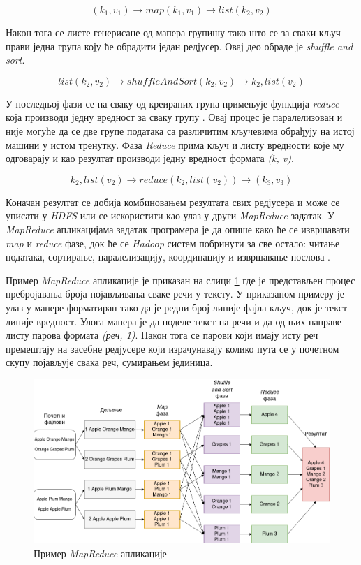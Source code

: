 \documentclass[12pt,oneside]{memoir}
\begin{document}
$$ (k_1, v_1) \rightarrow map(k_1, v_1) \rightarrow list(k_2, v_2) $$

Након тога се листе генерисане од мапера групишу тако што се за сваки кључ прави једна група коју ће обрадити један редјусер. Овај део обраде је \textit{shuffle and sort}. 

$$ list(k_2, v_2) \rightarrow shuffleAndSort(k_2, v_2) \rightarrow k_2, list(v_2) $$

У последњој фази се на сваку од креираних група примењује функција \textit{reduce} која производи једну вредност за сваку групу \cite{hadoop_learning}. Овај процес је паралелизован и није могуће да се две групе података са различитим кључевима обрађују на истој машини у истом тренутку. Фаза \textit{Reduce} прима кључ и листу вредности које му одговарају и као резултат производи једну вредност формата \textit{(k, v)}.

$$ k_2, list(v_2) \rightarrow reduce(k_2, list(v_2)) \rightarrow (k_3, v_3) $$

Коначан резултат се добија комбиновањем резултата свих редјусера и може се уписати у \textit{HDFS} или се искористити као улаз у други \textit{MapReduce} задатак. У \textit{MapReduce} апликацијама задатак програмера је да опише како ће се извршавати \textit{map} и \textit{reduce} фазе, док ће се \textit{Hadoop} систем побринути за све остало: читање података, сортирање, паралелизацију, координацију и извршавање послова \cite{hadoop_beginner}.

Пример \textit{MapReduce} апликације је приказан на слици \ref{fig:map_reduce} где је представљен процес пребројавања броја појављивања сваке речи у тексту. У приказаном примеру је улаз у мапере форматиран тако да је редни број линије фајла кључ, док је текст линије вредност. Улога мапера је да поделе текст на речи и да од њих направе листу парова формата \textit{(реч, 1)}. Након тога се парови који имају исту реч премештају на засебне редјусере који израчунавају колико пута се у почетном скупу појављује свака реч, сумирањем јединица.

\begin{figure}[!ht]
  \centering
  \includegraphics[width=1\textwidth]{pictures/mr_example_wordcount.png}
  \caption{Пример \textit{MapReduce} апликације}
  \label{fig:map_reduce}
\end{figure}
\end{document}
